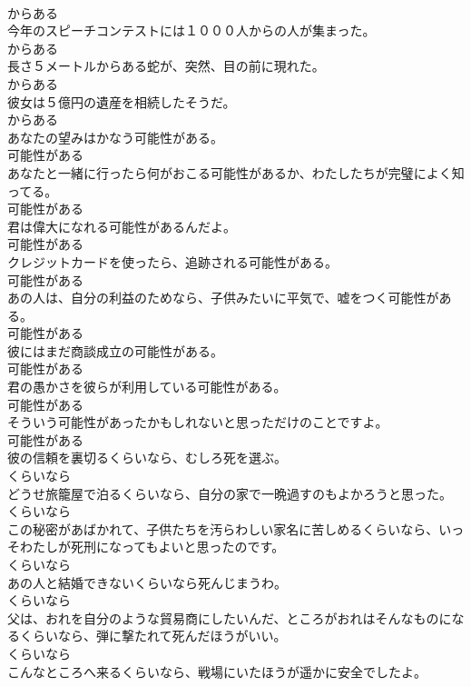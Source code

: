 \documentclass[8pt]{extreport}
\begin{document}
\begin{CJK}{UTF8}{min}
\\	からある
\\	今年のスピーチコンテストには１０００人からの人が集まった。	
\\	からある
\\	長さ５メートルからある蛇が、突然、目の前に現れた。	
\\	からある
\\	彼女は５億円の遺産を相続したそうだ。	
\\	からある
\\	あなたの望みはかなう可能性がある。	
\\	可能性がある
\\	あなたと一緒に行ったら何がおこる可能性があるか、わたしたちが完璧によく知ってる。	
\\	可能性がある
\\	君は偉大になれる可能性があるんだよ。	
\\	可能性がある
\\	クレジットカードを使ったら、追跡される可能性がある。	
\\	可能性がある
\\	あの人は、自分の利益のためなら、子供みたいに平気で、嘘をつく可能性がある。	
\\	可能性がある
\\	彼にはまだ商談成立の可能性がある。	
\\	可能性がある
\\	君の愚かさを彼らが利用している可能性がある。	
\\	可能性がある
\\	そういう可能性があったかもしれないと思っただけのことですよ。	
\\	可能性がある
\\	彼の信頼を裏切るくらいなら、むしろ死を選ぶ。	
\\	くらいなら
\\	どうせ旅籠屋で泊るくらいなら、自分の家で一晩過すのもよかろうと思った。	
\\	くらいなら
\\	この秘密があばかれて、子供たちを汚らわしい家名に苦しめるくらいなら、いっそわたしが死刑になってもよいと思ったのです。	
\\	くらいなら
\\	あの人と結婚できないくらいなら死んじまうわ。	
\\	くらいなら
\\	父は、おれを自分のような貿易商にしたいんだ、ところがおれはそんなものになるくらいなら、弾に撃たれて死んだほうがいい。	
\\	くらいなら
\\	こんなところへ来るくらいなら、戦場にいたほうが遥かに安全でしたよ。	

\end{CJK}
\end{document}
